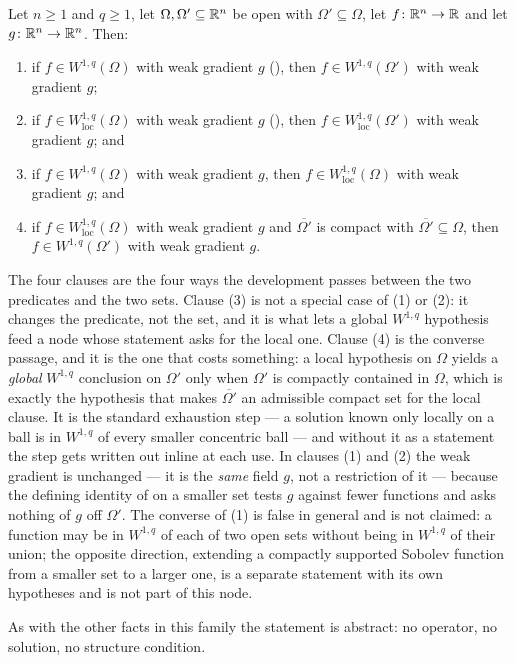 \begin{lemma}
Let $n\ge1$ and $q\ge1$, let $\Omega,\Omega'\subseteq\mathbb{R}^n$ be open with
$\Omega'\subseteq\Omega$, let $f\colon\mathbb{R}^n\to\mathbb{R}$ and let
$g\colon\mathbb{R}^n\to\mathbb{R}^n$.  Then:
\begin{enumerate}
\item if $f\in W^{1,q}(\Omega)$ with weak gradient $g$ (),
  then $f\in W^{1,q}(\Omega')$ with weak gradient $g$;
\item if $f\in W^{1,q}_{\mathrm{loc}}(\Omega)$ with weak gradient $g$
  (), then $f\in W^{1,q}_{\mathrm{loc}}(\Omega')$ with weak
  gradient $g$; and
\item if $f\in W^{1,q}(\Omega)$ with weak gradient $g$, then
  $f\in W^{1,q}_{\mathrm{loc}}(\Omega)$ with weak gradient $g$; and
\item if $f\in W^{1,q}_{\mathrm{loc}}(\Omega)$ with weak gradient $g$ and
  $\overline{\Omega'}$ is compact with $\overline{\Omega'}\subseteq\Omega$, then
  $f\in W^{1,q}(\Omega')$ with weak gradient $g$.
\end{enumerate}

The four clauses are the four ways the development passes between the two
predicates and the two sets.  Clause (3) is not a special case of (1) or (2):
it changes the predicate, not the set, and it is what lets a global
$W^{1,q}$ hypothesis feed a node whose statement asks for the local one.
Clause (4) is the converse passage, and it is the one that costs something: a
local hypothesis on $\Omega$ yields a \emph{global} $W^{1,q}$ conclusion on
$\Omega'$ only when $\Omega'$ is compactly contained in $\Omega$, which is
exactly the hypothesis that makes $\overline{\Omega'}$ an admissible compact set
for the local clause.  It is the standard exhaustion step --- a solution known
only locally on a ball is in $W^{1,q}$ of every smaller concentric ball --- and
without it as a statement the step gets written out inline at each use.  In
clauses (1) and (2) the weak gradient is unchanged --- it is the \emph{same}
field $g$, not a restriction of it --- because the defining identity of
 on a smaller set tests $g$ against fewer functions
and asks nothing of $g$ off $\Omega'$.  The converse of (1) is false in general
and is not claimed: a function may be in $W^{1,q}$ of each of two open sets
without being in $W^{1,q}$ of their union; the opposite direction, extending a
compactly supported Sobolev function from a smaller set to a larger one, is a
separate statement with its own hypotheses and is not part of this node.

As with the other facts in this family the statement is abstract: no operator,
no solution, no structure condition.
\end{lemma}
